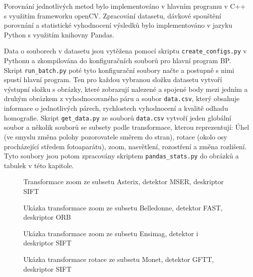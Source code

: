 
Porovnání jednotlivých metod bylo implementováno v hlavním programu v C++ s využitím frameworku
openCV. Zpracování datasetu, dávkové spouštění porovnání a statistické vyhodnocení výsledků bylo
implementováno v jazyku Python s využitím knihovny Pandas.


Data o souborech v datasetu jsou vytěžena pomocí skriptu \verb|create_configs.py| v Pythonu a zkompilována do konfiguračních souborů pro hlavní program BP. Skript \verb|run_batch.py| poté tyto konfigurační soubory načte a postupně s nimi spustí hlavní program. Ten pro každou vybranou složku datasetu vytvoří výstupní složku s obrázky, které zobrazují nalezené a spojené body mezi jedním a druhým obrázkem z vyhodnocovaného páru a soubor \verb|data.csv|, který obsahuje informace o jednotlivých párech, rychlostech vyhodnocení a kvalitě odhadu homografie. Skript \verb|get_data.py| ze souborů \verb|data.csv| vytvoří jeden globální soubor a několik souborů se subsety podle transformace, kterou reprezentují: Úhel (ve smyslu změna polohy pozorovatele směrem do stran), rotace (okolo osy procházející středem fotoaparátu), zoom, nasvětlení, rozostření a změna rozlišení. Tyto soubory jsou potom zpracovány skriptem \verb|pandas_stats.py| do obrázků a tabulek v této kapitole.



\begin{figure}[htp] 
	\caption{Transformace zoom ze subsetu Asterix, detektor MSER,
		deskriptor SIFT} \label{ex_asterix}
\end{figure}

\begin{figure}[htp] 
	\caption{Ukázka transformace zoom ze subsetu Belledonne, detektor FAST,
		deskriptor ORB}	\label{ex_belledonne}
\end{figure}

\begin{figure}[htp] 
	\caption{Ukázka transformace zoom ze subsetu Ensimag, detektor i 
		deskriptor SIFT} \label{ex_ensimag}
\end{figure}

\begin{figure}[htp] 
	\caption{Ukázka transformace rotace ze subsetu Monet, detektor GFTT, 
		deskriptor SIFT} \label{ex_MONET}
\end{figure}

